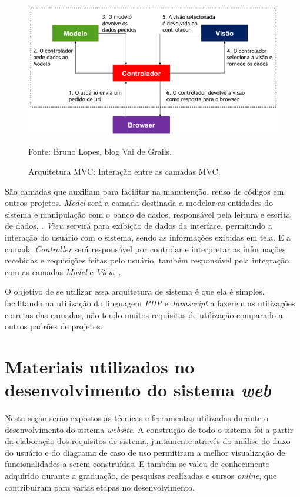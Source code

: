 \documentclass[
	12pt,				%
	openright,			%
	oneside,			%
	a4paper,			%
	english,			%
	french,				%
	spanish,			%
	brazil,				%
	]{abntex2}
\begin{document}
\begin{figure}[ht]
    \centering
    \caption{Arquitetura MVC: Interação entre as camadas MVC.}
    \includegraphics[width=5.0in]{Images/18MVC.png}
    \label{fig: grafico-acc}
    
    \centering \small Fonte: Bruno Lopes, blog Vai de Grails.
\end{figure}

São camadas que auxiliam para facilitar na manutenção, reuso de códigos em outros projetos. \textit{Model} será a camada destinada a modelar as entidades do sistema e manipulação com o banco de dados, responsável pela leitura e escrita de dados, \cite{Gamma2007}. \textit{View} servirá para exibição de dados da interface, permitindo a interação do usuário com o sistema, sendo as informações exibidas em tela. E a camada \textit{Controller} será responsável por controlar e interpretar as informações recebidas e requisições feitas pelo usuário, também responsável pela integração com as camadas \textit{Model} e \textit{View}, \cite{Wazlawick2013}.

O objetivo de se utilizar essa arquitetura de sistema é que ela é simples, facilitando na utilização da linguagem \textit{PHP} e \textit{Javascript} a fazerem as utilizações corretas das camadas, não tendo muitos requisitos de utilização comparado a outros padrões de projetos.



\section{Materiais utilizados no desenvolvimento do sistema \textit{web}}

Nesta seção serão expostos às técnicas e ferramentas utilizadas durante o desenvolvimento do sistema \textit{website}. A construção de todo o sistema foi a partir da elaboração dos requisitos de sistema, juntamente através do análise do fluxo do usuário e do diagrama de caso de uso permitiram a melhor visualização de funcionalidades a serem construídas. E também se valeu de conhecimento adquirido durante a graduação, de pesquisas realizadas e cursos \textit{online}, que contribuíram para várias etapas no desenvolvimento.
\end{document}
